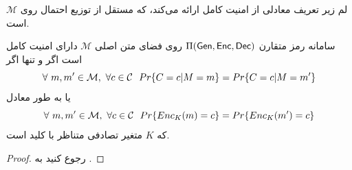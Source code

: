 لم زیر تعریف معادلی از امنیت کامل  ارائه می‌کند، که مستقل از توزیع احتمال روی 
$\mathcal{M}$
است.
\begin{lemma}
	\label{psecure2}
	سامانه‌  رمز متقارن 
	$\Pi(\mathsf{Gen}, \mathsf{Enc}, \mathsf{Dec})$
	روی فضای متن اصلی 
	$\mathcal{M}$
	دارای امنیت کامل است اگر و تنها اگر
	$$\forall \ m, m'\in\mathcal{M}, \ \forall c\in\mathcal{C} \  \ Pr\{C = c|M = m\} = Pr\{C = c|M = m'\}$$
	یا به طور معادل
	$$\forall \ m, m'\in\mathcal{M}, \ \forall c\in\mathcal{C} \  \ Pr\{Enc_{K}(m) = c\} = Pr\{Enc_{K}(m') = c\}$$
	که 
	$K$
	متغیر تصادفی متناظر با کلید است.
\begin{proof}
	رجوع کنید به 
	\cite{katz2014introduction}.

\end{proof}
\end{lemma}

